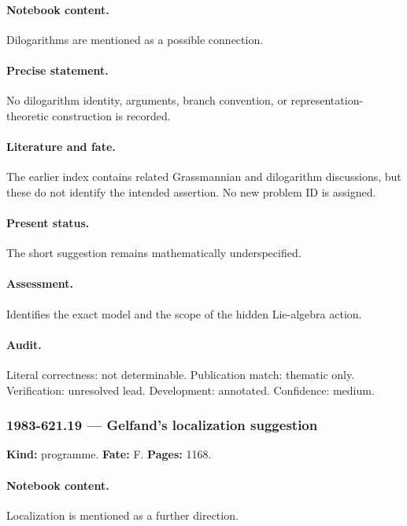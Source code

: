 \paragraph{Notebook content.} Dilogarithms are mentioned as a possible connection.

\paragraph{Precise statement.} No dilogarithm identity, arguments, branch convention, or representation-theoretic construction is recorded.

\paragraph{Literature and fate.} The earlier index contains related Grassmannian and dilogarithm discussions, but these do not identify the intended assertion. No new problem ID is assigned.

\paragraph{Present status.} The short suggestion remains mathematically underspecified.

\paragraph{Assessment.} Identifies the exact model and the scope of the hidden Lie-algebra action.

\paragraph{Audit.} Literal correctness: not determinable. Publication match: thematic only. Verification: unresolved lead. Development: annotated. Confidence: medium.

\subsubsection{1983-621.19 --- Gelfand’s localization suggestion}

\label{item:1983-621.19}

\noindent\textbf{Kind:} programme. \textbf{Fate:} F. \textbf{Pages:} 1168.\par

\paragraph{Notebook content.} Localization is mentioned as a further direction.

